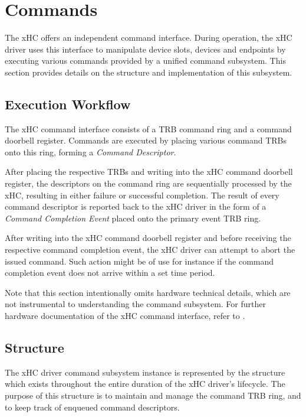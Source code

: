 \section{Commands}
\label{sec:commands}

The xHC offers an independent command interface. During operation, the xHC
driver uses this interface to manipulate device slots, devices and endpoints by
executing various commands provided by a unified command subsystem. This
section provides details on the structure and implementation of this subsystem.


\subsection{Execution Workflow}

The xHC command interface consists of a TRB command ring and a command doorbell
register. Commands are executed by placing various command TRBs onto this ring,
forming a \textit{Command Descriptor}.

After placing the respective TRBs and writing into the xHC command doorbell
register, the descriptors on the command ring are sequentially processed by the
xHC, resulting in either failure or successful completion. The result of every
command descriptor is reported back to the xHC driver in the form of a
\textit{Command Completion Event} placed onto the primary event TRB ring.

After writing into the xHC command doorbell register and before receiving the
respective command completion event, the xHC driver can attempt to abort the
issued command. Such action might be of use for instance if the command
completion event does not arrive within a set time period.

Note that this section intentionally omits hardware technical details, which are
not instrumental to understanding the command subsystem. For further hardware
documentation of the xHC command interface, refer to .


\subsection{Structure}

The xHC driver command subsystem instance is represented by the
 structure which exists throughout the entire duration
of the xHC driver's lifecycle. The purpose of this structure is to maintain and
manage the command TRB ring, and to keep track of enqueued command descriptors.


